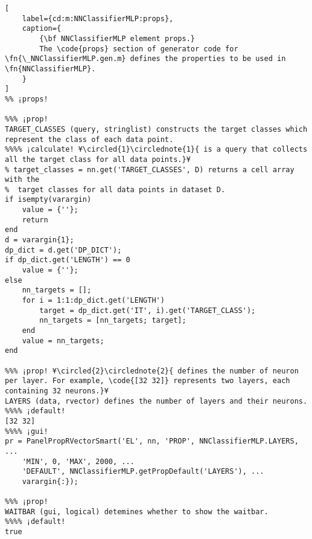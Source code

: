 \documentclass{tufte-handout}
\begin{document}
\begin{lstlisting}[
	label={cd:m:NNClassifierMLP:props},
	caption={
		{\bf NNClassifierMLP element props.}
		The \code{props} section of generator code for \fn{\_NNClassifierMLP.gen.m} defines the properties to be used in \fn{NNClassifierMLP}.
	}
]
%% ¡props!

%%% ¡prop!
TARGET_CLASSES (query, stringlist) constructs the target classes which represent the class of each data point.
%%%% ¡calculate! ¥\circled{1}\circlednote{1}{ is a query that collects all the target class for all data points.}¥
% target_classes = nn.get('TARGET_CLASSES', D) returns a cell array with the
%  target classes for all data points in dataset D.
if isempty(varargin)
    value = {''};
    return
end
d = varargin{1};
dp_dict = d.get('DP_DICT');
if dp_dict.get('LENGTH') == 0
    value = {''};
else
    nn_targets = [];
    for i = 1:1:dp_dict.get('LENGTH')
        target = dp_dict.get('IT', i).get('TARGET_CLASS');
        nn_targets = [nn_targets; target];
    end
    value = nn_targets;
end

%%% ¡prop! ¥\circled{2}\circlednote{2}{ defines the number of neuron per layer. For example, \code{[32 32]} represents two layers, each containing 32 neurons.}¥
LAYERS (data, rvector) defines the number of layers and their neurons.
%%%% ¡default!
[32 32]
%%%% ¡gui!
pr = PanelPropRVectorSmart('EL', nn, 'PROP', NNClassifierMLP.LAYERS, ...
    'MIN', 0, 'MAX', 2000, ...
    'DEFAULT', NNClassifierMLP.getPropDefault('LAYERS'), ...
    varargin{:});

%%% ¡prop!
WAITBAR (gui, logical) detemines whether to show the waitbar.
%%%% ¡default!
true

\end{lstlisting}

\clearpage
\end{document}
